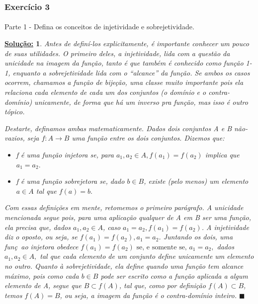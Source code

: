 \documentclass{article}
\newtheorem*{sol*}{\underline{Solu\c c\~ao:}}
\renewcommand\qedsymbol{$\blacksquare$}
\begin{document}
\subsubsection{Exerc\'icio 3}
\paragraph{}Parte 1  - Defina os conceitos de injetividade e sobrejetividade.
\begin{sol*}
Antes de defin\'i-los explicitamente, \'e importante conhecer um pouco de suas utilidades. O primeiro deles, a injetividade, lida com a quest\~ao da unicidade na imagem da fun\c c\~ao, tanto \'e que tamb\'em \'e conhecido como fun\c c\~ao 1-1, enquanto a sobrejetividade lida com o ``alcance'' da fun\c c\~ao. Se ambos os casos ocorrem, chamamos a fun\c c\~ao de bije\c c\~ao, uma classe muito importante pois ela relaciona cada elemento de cada um dos conjuntos (o dom\'inio e o contra-dom\'inio) unicamente, de forma que h\'a um inverso pra fun\c c\~ao, mas isso \'e outro t\'opico. 

Destarte, definamos ambas matematicamente. Dados dois conjuntos A e B n\~ao-vazios, seja $f:A\rightarrow{B}$ uma fun\c c\~ao entre os dois conjuntos. Dizemos que:
\begin{itemize}
\item[a)] f \'e uma fun\c c\~ao injetora se, para $a_1, a_2\in{A}, f(a_1) = f(a_2)$ implica que $a_1 =  a_2.$
\item[b)] f \'e uma fun\c c\~ao sobrejetora se, dado $b\in{B}$, existe (pelo menos) um elemento $a\in{A}$ tal que $f(a) = b.$
\end{itemize}

Com essas defini\c c\~oes em mente, retomemos o primeiro par\'agrafo. A unicidade mencionada segue pois, para uma aplica\c c\~ao qualquer de A em B ser uma fun\c c\~ao, ela precisa que, dados $a_1, a_2\in{A}$, caso $a_1 = a_2, f(a_1) = f(a_2)$. A injetividade diz o oposto, ou seja, se $f(a_1) = f(a_2), a_1 = a_2$. Juntando os dois, uma fun\c c~ao injetora obedece $f(a_1) = f(a_2) \text{ se, e somente se, } a_1 = a_2,$ dados $a_1, a_2\in{A},$ tal que cada elemento de um conjunto define unicamente um elemento no outro. Quanto \`a sobrejetividade, ela define quando uma fun\c c\~ao tem alcance m\'aximo, pois como cada $b\in{B}$ pode ser escrito como a fun\c c\~ao aplicada a algum elemento de A, segue que $B \subset f(A)$, tal que, como por defini\c c\~ao $f(A) \subset B$, temos $f(A) = B$, ou seja, a imagem da fun\c c\~ao \'e o contra-dom\'inio inteiro.
\qedsymbol
\end{sol*}
\end{document}
